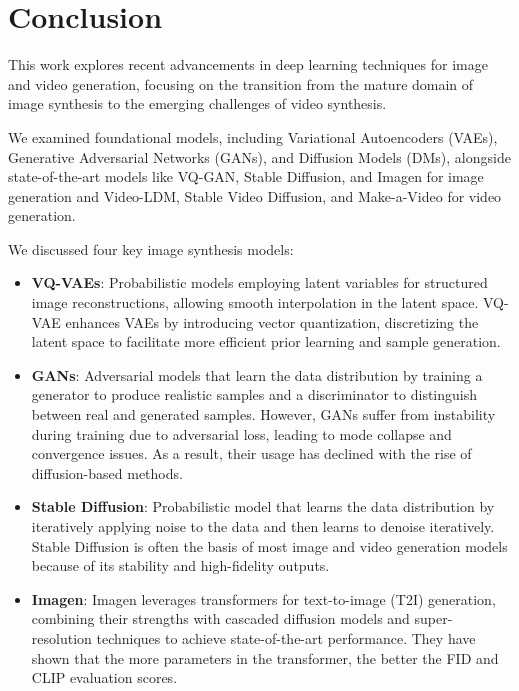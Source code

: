 \section{Conclusion}

This work explores recent advancements in deep learning techniques for image and video generation, focusing on the transition from the mature domain of image synthesis to the emerging challenges of video synthesis.

We examined foundational models, including Variational Autoencoders (VAEs), Generative Adversarial Networks (GANs), and Diffusion Models (DMs), alongside state-of-the-art models like VQ-GAN, Stable Diffusion, and Imagen for image generation and Video-LDM, Stable Video Diffusion, and Make-a-Video for video generation.

We discussed four key image synthesis models:

\begin{itemize}
    \item \textbf{VQ-VAEs}: Probabilistic models employing latent variables for structured image reconstructions, allowing smooth interpolation in the latent space. VQ-VAE enhances VAEs by introducing vector quantization, discretizing the latent space to facilitate more efficient prior learning and sample generation.
    
    \item \textbf{GANs}: Adversarial models that learn the data distribution by training a generator to produce realistic samples and a discriminator to distinguish between real and generated samples. However, GANs suffer from instability during training due to adversarial loss, leading to mode collapse and convergence issues. As a result, their usage has declined with the rise of diffusion-based methods.
    
    \item \textbf{Stable Diffusion}: Probabilistic model that learns the data distribution by iteratively applying noise to the data and then learns to denoise iteratively. Stable Diffusion is often the basis of most image and video generation models because of its stability and high-fidelity outputs.
    
    \item \textbf{Imagen}: Imagen leverages transformers for text-to-image (T2I) generation, combining their strengths with cascaded diffusion models and super-resolution techniques to achieve state-of-the-art performance. They have shown that the more parameters in the transformer, the better the FID and CLIP evaluation scores.
\end{itemize}

